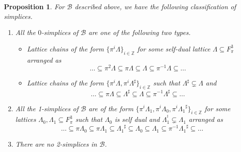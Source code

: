 \documentclass{eptcs}
\newtheorem{proposition}[theorem]{Proposition}
\theoremstyle{remark}
\theoremstyle{definition}
\newcommand{\dual}[1]{{#1}^{\sharp}}
\begin{document}
\begin{proposition}
    \label{pr:simplex_classification_appendix}
For $\mathcal{B}$ described above, we have the following classification of simplices.
  \begin{enumerate}
    \item All the $0$-simplices  of $\mathcal{B}$ are one of the following two types.
      \begin{itemize}

          \item 
Lattice chains of the form $\{ \pi^{i}\Lambda\}_{i \in \mathbb{Z}}$ for some self-dual lattice $\Lambda \subseteq F_{\pi}^{3}$  arranged as 
\begin{equation}
    \dots \subseteq \pi^{2} \Lambda \subseteq \pi \Lambda \subseteq \Lambda \subseteq \pi^{-1} \Lambda \subseteq \dots
\end{equation}
    \item 
	Lattice chains of the form $\{ \pi^i\Lambda, \pi^i \dual{\Lambda}\}_{i \in \mathbb{Z}}$ 
	 such that $\dual{\Lambda} \subsetneq\Lambda$ and
	 \begin{equation}
	       \dots \subseteq \pi \Lambda \subseteq \dual{\Lambda}  \subseteq \Lambda \subseteq \pi^{-1} \dual{\Lambda}  \subseteq \dots
	 \end{equation}
      \end{itemize}
  \item All the 1-simplices of $\mathcal{B}$ are of the form $\{ \pi^i\Lambda_1, \pi^i \Lambda_0, \pi^i \dual{\Lambda_{1}} \}_{i \in \mathbb{Z}}$  for some lattices $\Lambda_0,\Lambda_1\subseteq F_{{\pi}}^3$ 
      such that $\Lambda_0$ is self dual and $\Lambda_1^{\dual{}} \subsetneq \Lambda_1$ arranged as
      \begin{equation}
              \dots \subseteq \pi \Lambda_0 \subseteq \pi\Lambda_{1}  \subseteq \dual{\Lambda_{1}} \subseteq \Lambda_0 \subseteq \Lambda_{1} \subseteq \pi^{-1} \dual{\Lambda_{1}} \subseteq \dots
      \end{equation}
      
      \item There are no 2-simplices in $\mathcal{B}$.
      \end{enumerate}
\end{proposition}
\end{document}

